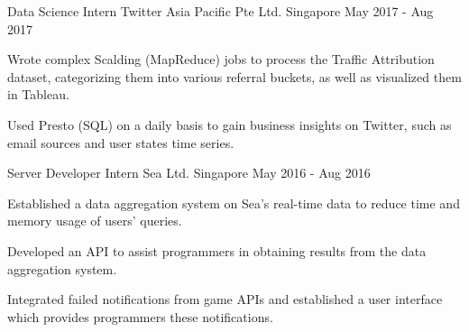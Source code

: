 

\begin{cventries}

	\cventry
	{Data Science Intern} %
	{Twitter Asia Pacific Pte Ltd.} %
	{Singapore} %
	{May 2017 - Aug 2017} %
	{
		\begin{cvitems} %
		\item {Wrote complex Scalding (MapReduce) jobs to process the Traffic Attribution dataset, categorizing them into various referral buckets, as well as visualized them in Tableau.}
		\item {Used Presto (SQL) on a daily basis to gain business insights on Twitter, such as email sources and user states time series.}
		\end{cvitems}
	}

	\cventry
	{Server Developer Intern} %
	{Sea Ltd.} %
	{Singapore} %
	{May 2016 - Aug 2016} %
	{
		\begin{cvitems} %
		\item {Established a data aggregation system on Sea's real-time data to reduce time and memory usage of users' queries.}
		\item {Developed an API to assist programmers in obtaining results from the data aggregation system.}
		\item {Integrated failed notifications from game APIs and established a user interface which provides programmers these notifications.}
		\end{cvitems}
	}

\end{cventries}
